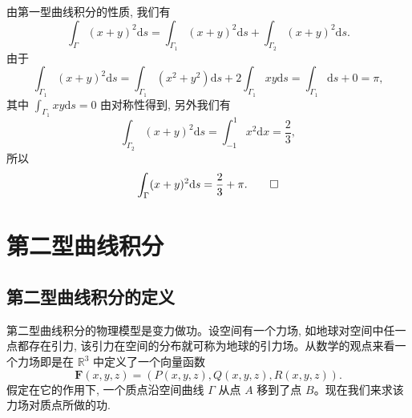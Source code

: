 \begin{solve}
由第一型曲线积分的性质, 我们有
\[
  \int_\Gamma (x+y)^2\mathrm ds
  =\int_{\Gamma_1}(x+y)^2\mathrm ds+\int_{\Gamma_2}(x+y)^2\mathrm ds.
\]
由于
\[
  \int_{\Gamma_1}(x+y)^2\mathrm ds
  =\int_{\Gamma_1}(x^2+y^2)\mathrm ds+2\int_{\Gamma_1}xy\mathrm ds
  =\int_{\Gamma_1}\mathrm ds+0=\pi,
\]
其中 $\int_{\Gamma_1}xy\mathrm ds=0$ 由对称性得到, 另外我们有
\[
  \int_{\Gamma_2}(x+y)^2\mathrm ds
  =\int_{-1}^1 x^2\mathrm dx=\frac23,
\]
所以
\[
  \int_\Gamma (x+y)^2\mathrm ds=\frac23+\pi.
\qedhere
\]
\end{solve}


\section{第二型曲线积分}
\label{sec:ma-16-2}

\subsection{第二型曲线积分的定义}
\label{subsec:ma-16-2-1}

第二型曲线积分的物理模型是变力做功。设空间有一个力场, 如地球对空间中任一点都存在引力, 该引力在空间的分布就可称为地球的引力场。从数学的观点来看一个力场即是在 $\mathbb R^3$ 中定义了一个向量函数
\[
  \boldsymbol F(x,y,z)=(P(x,y,z),Q(x,y,z),R(x,y,z)).
\]
假定在它的作用下, 一个质点沿空间曲线 $\Gamma$ 从点 $A$ 移到了点 $B$。现在我们来求该力场对质点所做的功.

